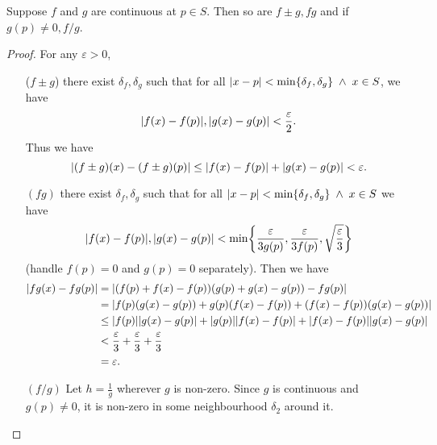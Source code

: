 \begin{thm} \label{thm:cont:laws}
    Suppose $f$ and $g$ are continuous at $p \in S$. Then so are $f \pm g, fg$ and if $g(p) \neq 0, f/g$.
\end{thm}
\begin{proof}
    For any $\varepsilon > 0$,
    \begin{enumerate}[label=(\alph*)]
        \item[($f \pm g$)] there exist $\delta_{f}, \delta_{g}$ such that for all $\abs{x - p} < \min \set{\delta_{f}, \delta_{g}} \;\land\; x \in S$, we have \[
            \abs{f(x) - f(p)}, \abs{g(x) - g(p)} < \frac{\varepsilon}{2}.
        \]
        Thus we have \[
            \abs{(f \pm g)(x) - (f \pm g)(p)} \leq \abs{f(x) - f(p)} + \abs{g(x) - g(p)} < \varepsilon.
        \] 
        \item[$(fg)$] there exist $\delta_{f}, \delta_{g}$ such that for all $\abs{x - p} < \min \set{\delta_{f}, \delta_{g}} \;\land\; x \in S$ we have \[
            \abs{f(x) - f(p)}, \abs{g(x) - g(p)} < \min\set{\frac{\varepsilon}{3g(p)}, \frac{\varepsilon}{3f(p)}, \sqrt{\frac{\varepsilon}{3}}}
        \]
        (handle $f(p) = 0$ and $g(p) = 0$ separately). Then we have
        \begin{align*}
            \abs{fg (x) - fg (p)} &= \abs{(f(p) + f(x) - f(p))(g(p) + g(x) - g(p)) - fg(p)} \\
            &= \abs{f(p) (g(x) - g(p)) + g(p) (f(x) - f(p)) + (f(x) - f(p))(g(x) - g(p))} \\
            &\leq \abs{f(p)} \abs{g(x) - g(p)} + \abs{g(p)} \abs{f(x) - f(p)} + \abs{f(x) - f(p)} \abs{g(x) - g(p)} \\
            &< \frac{\varepsilon}{3} + \frac{\varepsilon}{3} + \frac{\varepsilon}{3} \\
            &= \varepsilon.
        \end{align*}

        \item[$(f/g)$] Let $h = \frac{1}{g}$ wherever $g$ is non-zero. Since $g$ is continuous and $g(p) \neq 0$, it is non-zero in some neighbourhood $\delta_{2}$ around it.


\end{enumerate}
\end{proof}
